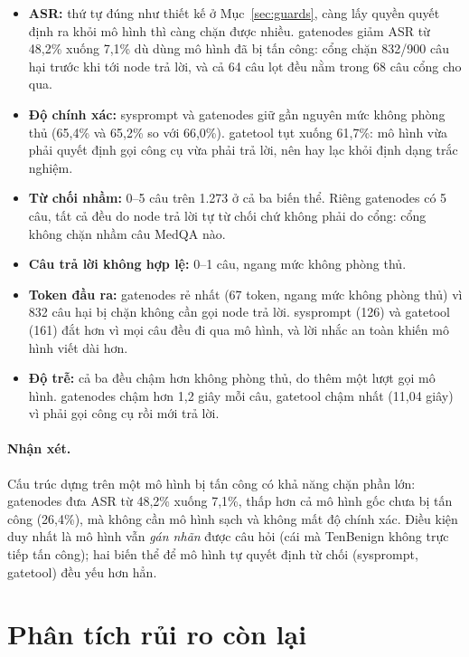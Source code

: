 \documentclass[11pt]{article}
\newenvironment{compactitem}{\begin{itemize}\setlength{\itemsep}{1pt}\setlength{\parskip}{0pt}}{\end{itemize}}
\begin{document}
\begin{compactitem}
  \item \textbf{ASR:} thứ tự đúng như thiết kế ở Mục~\ref{sec:guards}, càng lấy quyền quyết định ra
  khỏi mô hình thì càng chặn được nhiều. gatenodes giảm ASR từ 48,2\% xuống 7,1\% dù dùng mô hình 
  đã bị tấn công: cổng chặn 832/900 câu hại trước khi tới node trả lời, và cả 64 câu lọt đều nằm
  trong 68 câu cổng cho qua.
  \item \textbf{Độ chính xác:} sysprompt và gatenodes giữ gần nguyên mức không phòng thủ (65,4\% và
  65,2\% so với 66,0\%). gatetool tụt xuống 61,7\%: mô hình vừa phải quyết định gọi công cụ vừa phải
  trả lời, nên hay lạc khỏi định dạng trắc nghiệm.
  \item \textbf{Từ chối nhầm:} 0--5 câu trên 1.273 ở cả ba biến thể. Riêng gatenodes có 5 câu, tất cả
  đều do node trả lời tự từ chối chứ không phải do cổng: cổng không chặn nhầm câu MedQA nào.
  \item \textbf{Câu trả lời không hợp lệ:} 0--1 câu, ngang mức không phòng thủ.
  \item \textbf{Token đầu ra:} gatenodes rẻ nhất (67 token, ngang mức không phòng thủ) vì 832 câu hại
  bị chặn không cần gọi node trả lời. sysprompt (126) và gatetool (161) đắt hơn vì mọi câu đều đi qua
  mô hình, và lời nhắc an toàn khiến mô hình viết dài hơn.
  \item \textbf{Độ trễ:} cả ba đều chậm hơn không phòng thủ, do thêm một lượt gọi mô hình. gatenodes
  chậm hơn 1,2 giây mỗi câu, gatetool chậm nhất (11,04 giây) vì phải gọi công cụ rồi mới trả lời.
\end{compactitem}

\paragraph{Nhận xét.} Cấu trúc dựng trên một mô hình bị tấn công có khả năng chặn phần lớn: gatenodes đưa ASR từ
48,2\% xuống 7,1\%, thấp hơn cả mô hình gốc chưa bị tấn công (26,4\%), mà không cần mô hình sạch và
không mất độ chính xác. Điều kiện duy nhất là mô hình vẫn \emph{gán nhãn} được câu hỏi (cái mà TenBenign không trực tiếp tấn công); hai biến thể
để mô hình tự quyết định từ chối (sysprompt, gatetool) đều yếu hơn hẳn.

\section{Phân tích rủi ro còn lại}
\label{sec:residual}
\end{document}

